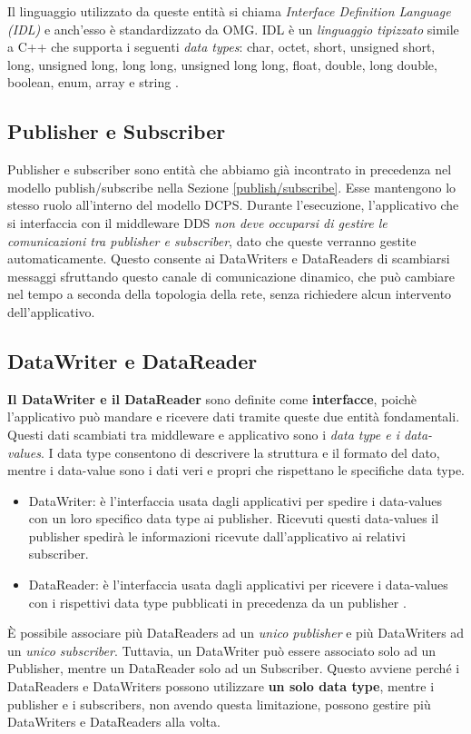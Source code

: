 Il linguaggio utilizzato da queste entità si chiama \textit{Interface 
Definition Language (IDL)} e anch'esso è standardizzato da OMG. 
IDL è un \textit{linguaggio tipizzato} 
simile a C++ che supporta i seguenti \textit{data types}: char, octet, short,
unsigned short, long, unsigned long, long long, unsigned long long, 
float, double, long double, boolean, enum, array e string
\cite{1494965}.


\subsection{Publisher e Subscriber}
Publisher e subscriber sono entità che abbiamo già incontrato
in precedenza nel modello publish/subscribe nella Sezione
\ref{publish/subscribe}. Esse 
mantengono lo stesso ruolo all'interno del modello DCPS. 
Durante l'esecuzione, l'applicativo che si interfaccia con il 
middleware DDS \textit{non deve occuparsi 
di gestire le comunicazioni tra publisher e subscriber}, dato 
che queste verranno gestite automaticamente. 
Questo consente ai DataWriters e DataReaders di 
scambiarsi messaggi sfruttando questo canale di comunicazione
dinamico,
che può cambiare nel tempo a seconda della topologia della rete, 
senza richiedere alcun intervento dell'applicativo. 

\subsection{DataWriter e DataReader}

\textbf{Il DataWriter e il DataReader} sono definite come \textbf{interfacce}, 
poichè l'applicativo
può mandare e ricevere dati
tramite queste due entità fondamentali. 
Questi dati scambiati tra middleware e applicativo
sono i \textit{data type e i data-values}. I data type consentono di 
descrivere la struttura e il formato del dato, mentre i data-value
sono i dati veri e propri che rispettano le specifiche data type.
\begin{itemize}
    \item DataWriter: è l'interfaccia usata dagli applicativi 
    per spedire i
    data-values con un loro specifico data type ai publisher.
    Ricevuti questi data-values il publisher spedirà le
    informazioni ricevute dall'applicativo ai relativi subscriber.
    \item DataReader: è l'interfaccia usata dagli applicativi per
    ricevere i data-values con i rispettivi data type pubblicati in
    precedenza da un publisher \cite{dds1.4}.
\end{itemize}
È possibile
associare più DataReaders ad un \textit{unico publisher} e più DataWriters ad
un \textit{unico subscriber}. Tuttavia, un DataWriter può essere associato solo ad un 
Publisher, mentre un DataReader solo ad un Subscriber. 
Questo avviene perché
i DataReaders e DataWriters possono utilizzare \textbf{un solo data type}, 
mentre 
i publisher e i subscribers, non avendo questa limitazione, possono gestire 
più DataWriters e DataReaders alla volta.

